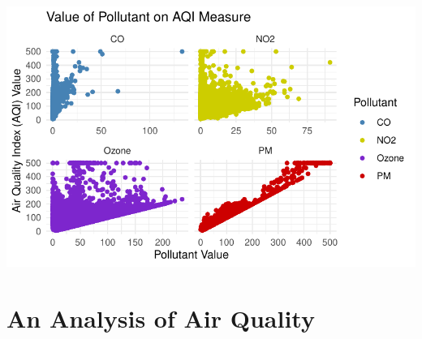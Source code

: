 \documentclass[
  letterpaper,
  DIV=11,
  numbers=noendperiod]{scrartcl}
\begin{document}
\includegraphics{FinalProject_files/figure-pdf/unnamed-chunk-2-2.pdf}

\section{An Analysis of Air Quality}\label{an-analysis-of-air-quality}

\newpage{}

\begin{figure}

\caption{\label{fig-CountryAQI}}


\end{figure}%
\end{document}
